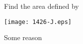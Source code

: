 \documentclass[14pt,fleqn]{extarticle}
\begin{document}
 
\begin{problem}
	\statement 
    
    Find the area defined by 
    
    \begin{step}
  \begin{options} 
     \correct 
       
       \begin{center}
\texttt{[image: 1426-J.eps]}
\end{center}
        
    \end{options} 
     \reason
     
     Some reason  
       
\end{step} 
\end{problem} 
\end{document}
